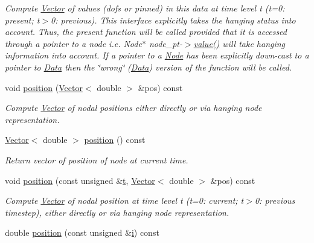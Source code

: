 \begin{DoxyCompactItemize}
\begin{DoxyCompactList}\small\item\em Compute \hyperlink{classoomph_1_1Vector}{Vector} of values (dofs or pinned) in this data at time level t (t=0\+: present; t$>$0\+: previous). This interface explicitly takes the hanging status into account. Thus, the present function will be called provided that it is accessed through a pointer to a node i.\+e. Node$\ast$ node\+\_\+pt-\/$>$\hyperlink{classoomph_1_1Node_afcc5cdba40bca251826ae5bee5ca15b4}{value()} will take hanging information into account. If a pointer to a \hyperlink{classoomph_1_1Node}{Node} has been explicitly down-\/cast to a pointer to \hyperlink{classoomph_1_1Data}{Data} then the \char`\"{}wrong\char`\"{} (\hyperlink{classoomph_1_1Data}{Data}) version of the function will be called. \end{DoxyCompactList}\item 
void \hyperlink{classoomph_1_1Node_a61c3ad6b319e4d2cce38dc8faae1bfae}{position} (\hyperlink{classoomph_1_1Vector}{Vector}$<$ double $>$ \&pos) const
\begin{DoxyCompactList}\small\item\em Compute \hyperlink{classoomph_1_1Vector}{Vector} of nodal positions either directly or via hanging node representation. \end{DoxyCompactList}\item 
\hyperlink{classoomph_1_1Vector}{Vector}$<$ double $>$ \hyperlink{classoomph_1_1Node_ac82057a4f66ef4848ee4e61fad312ad7}{position} () const
\begin{DoxyCompactList}\small\item\em Return vector of position of node at current time. \end{DoxyCompactList}\item 
void \hyperlink{classoomph_1_1Node_abc8756948b04cb82f9f32a44ef9c69f9}{position} (const unsigned \&\hyperlink{cfortran_8h_af6f0bd3dc13317f895c91323c25c2b8f}{t}, \hyperlink{classoomph_1_1Vector}{Vector}$<$ double $>$ \&pos) const
\begin{DoxyCompactList}\small\item\em Compute \hyperlink{classoomph_1_1Vector}{Vector} of nodal position at time level t (t=0\+: current; t$>$0\+: previous timestep), either directly or via hanging node representation. \end{DoxyCompactList}\item 
double \hyperlink{classoomph_1_1Node_a05963e00bfc7dd92399a5b2230f77032}{position} (const unsigned \&\hyperlink{cfortran_8h_adb50e893b86b3e55e751a42eab3cba82}{i}) const

\end{DoxyCompactItemize}
